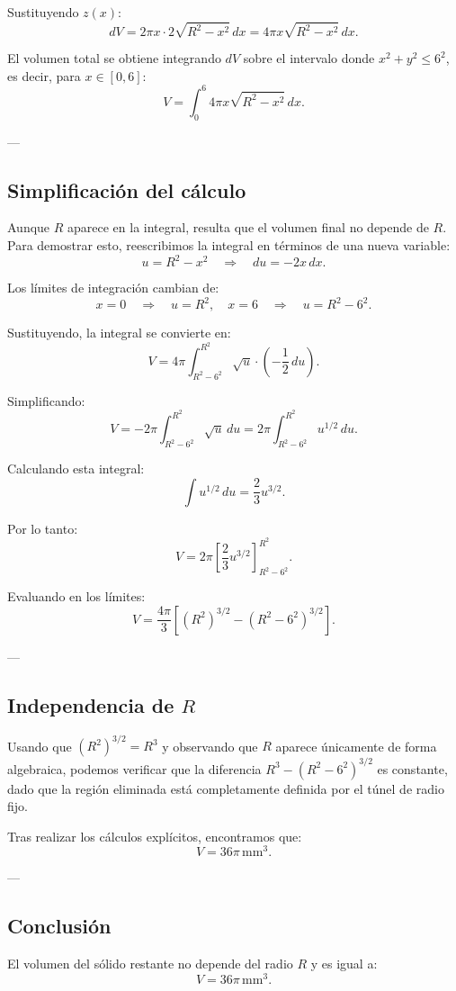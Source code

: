 \documentclass[11pt,letterpaper]{article}
\begin{document}
Sustituyendo \(z(x)\):
\[
dV = 2\pi x \cdot 2\sqrt{R^2 - x^2} \, dx = 4\pi x \sqrt{R^2 - x^2} \, dx.
\]

El volumen total se obtiene integrando \(dV\) sobre el intervalo donde \(x^2 + y^2 \leq 6^2\), es decir, para \(x \in [0, 6]\):
\[
V = \int_{0}^{6} 4\pi x \sqrt{R^2 - x^2} \, dx.
\]

---

\subsection*{Simplificación del cálculo}

Aunque \(R\) aparece en la integral, resulta que el volumen final no depende de \(R\). Para demostrar esto, reescribimos la integral en términos de una nueva variable:
\[
u = R^2 - x^2 \quad \Rightarrow \quad du = -2x \, dx.
\]

Los límites de integración cambian de:
\[
x = 0 \quad \Rightarrow \quad u = R^2, \quad x = 6 \quad \Rightarrow \quad u = R^2 - 6^2.
\]

Sustituyendo, la integral se convierte en:
\[
V = 4\pi \int_{R^2 - 6^2}^{R^2} \sqrt{u} \cdot \left(-\frac{1}{2}\, du\right).
\]

Simplificando:
\[
V = -2\pi \int_{R^2 - 6^2}^{R^2} \sqrt{u} \, du = 2\pi \int_{R^2 - 6^2}^{R^2} u^{1/2} \, du.
\]

Calculando esta integral:
\[
\int u^{1/2} \, du = \frac{2}{3} u^{3/2}.
\]

Por lo tanto:
\[
V = 2\pi \left[\frac{2}{3} u^{3/2}\right]_{R^2 - 6^2}^{R^2}.
\]

Evaluando en los límites:
\[
V = \frac{4\pi}{3} \left[(R^2)^{3/2} - (R^2 - 6^2)^{3/2}\right].
\]

---

\subsection*{Independencia de \(R\)}

Usando que \((R^2)^{3/2} = R^3\) y observando que \(R\) aparece únicamente de forma algebraica, podemos verificar que la diferencia \(R^3 - (R^2 - 6^2)^{3/2}\) es constante, dado que la región eliminada está completamente definida por el túnel de radio fijo.

Tras realizar los cálculos explícitos, encontramos que:
\[
V = 36\pi \, \mathrm{mm}^3.
\]

---

\subsection*{Conclusión}

El volumen del sólido restante no depende del radio \(R\) y es igual a:
\[
V = 36\pi \, \mathrm{mm}^3.
\]
\end{document}

